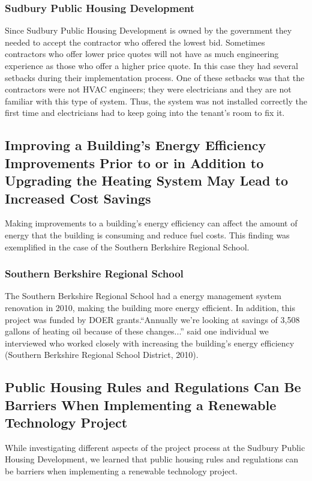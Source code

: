 \subsubsection{Sudbury Public Housing Development}
\par Since Sudbury Public Housing  Development is owned by the government they needed to accept the contractor who offered the lowest bid. Sometimes contractors who offer lower price quotes will not have as much engineering experience as those who offer a higher price quote. In this case they had several setbacks during their implementation process. One of these setbacks was that the contractors were not HVAC engineers; they were electricians and they are not familiar with this type of system. Thus, the system was not installed correctly the first time and electricians had to keep going into the tenant's room to fix it.

\subsection{Improving a Building’s Energy Efficiency Improvements Prior to or in Addition to Upgrading the Heating System May Lead to Increased Cost Savings}
\par Making improvements to a building’s energy efficiency can affect the amount of energy that the building is consuming and reduce fuel costs. This finding was exemplified in the case of the Southern Berkshire Regional School.

\subsubsection{Southern Berkshire Regional School}
\par The Southern Berkshire Regional School had a energy management system renovation in 2010, making the building more energy efficient. In addition, this project was funded by DOER grants.“Annually we’re looking at savings of 3,508 gallons of heating oil because of these changes...” said one individual we interviewed who worked closely with increasing the building’s energy efficiency (Southern Berkshire Regional School District, 2010).

\subsection{Public Housing Rules and Regulations Can Be Barriers When Implementing a Renewable Technology Project}
\par While investigating different aspects of the project process at the Sudbury Public Housing Development, we learned that public housing rules and regulations can be barriers when implementing a renewable technology project. 
